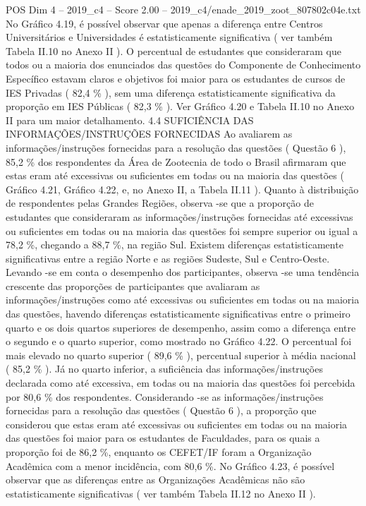 \begin{textsample}{POS Dim 4 – 2019\_c4 – Score 2.00 – 2019\_c4/enade\_2019\_zoot\_807802c04e.txt}
No Gráfico 4.19, é possível observar que apenas a diferença entre Centros Universitários e Universidades é estatisticamente significativa ( ver também Tabela II.10 no Anexo II ).
O percentual de estudantes que consideraram que todos ou a maioria dos enunciados das questões do Componente de Conhecimento Específico estavam claros e objetivos foi maior para os estudantes de cursos de IES Privadas ( 82,4 \% ), sem uma diferença estatisticamente significativa da proporção em IES Públicas ( 82,3 \% ).
Ver Gráfico 4.20 e Tabela II.10 no Anexo II para um maior detalhamento. 4.4 SUFICIÊNCIA DAS INFORMAÇÕES/INSTRUÇÕES FORNECIDAS Ao avaliarem as informações/instruções fornecidas para a resolução das questões ( Questão 6 ), 85,2 \% dos respondentes da Área de Zootecnia de todo o Brasil afirmaram que estas eram até excessivas ou suficientes em todas ou na maioria das questões ( Gráfico 4.21, Gráfico 4.22, e, no Anexo II, a Tabela II.11 ).
Quanto à distribuição de respondentes pelas Grandes Regiões, observa -se que a proporção de estudantes que consideraram as informações/instruções fornecidas até excessivas ou suficientes em todas ou na maioria das questões foi sempre superior ou igual a 78,2 \%, chegando a 88,7 \%, na região Sul.
Existem diferenças estatisticamente significativas entre a região Norte e as regiões Sudeste, Sul e Centro-Oeste.
Levando -se em conta o desempenho dos participantes, observa -se uma tendência crescente das proporções de participantes que avaliaram as informações/instruções como até excessivas ou suficientes em todas ou na maioria das questões, havendo diferenças estatisticamente significativas entre o primeiro quarto e os dois quartos superiores de desempenho, assim como a diferença entre o segundo e o quarto superior, como mostrado no Gráfico 4.22.
O percentual foi mais elevado no quarto superior ( 89,6 \% ), percentual superior à média nacional ( 85,2 \% ).
Já no quarto inferior, a suficiência das informações/instruções declarada como até excessiva, em todas ou na maioria das questões foi percebida por 80,6 \% dos respondentes.
Considerando -se as informações/instruções fornecidas para a resolução das questões ( Questão 6 ), a proporção que considerou que estas eram até excessivas ou suficientes em todas ou na maioria das questões foi maior para os estudantes de Faculdades, para os quais a proporção foi de 86,2 \%, enquanto os CEFET/IF foram a Organização Acadêmica com a menor incidência, com 80,6 \%.
No Gráfico 4.23, é possível observar que as diferenças entre as Organizações Acadêmicas não são estatisticamente significativas ( ver também Tabela II.12 no Anexo II ).

\end{textsample}
